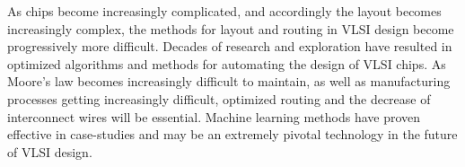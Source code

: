 
As chips become increasingly complicated, and accordingly the 
layout becomes increasingly complex, the methods for layout
and routing in VLSI design become progressively more difficult.
Decades of research and exploration have resulted in optimized
algorithms and methods for automating the design of VLSI chips.
As Moore's law becomes increasingly difficult to maintain,
as well as manufacturing processes getting increasingly difficult,
optimized routing and the decrease of interconnect wires will
be essential. Machine learning methods have proven effective
in case-studies and may be an extremely pivotal technology in
the future of VLSI design.
